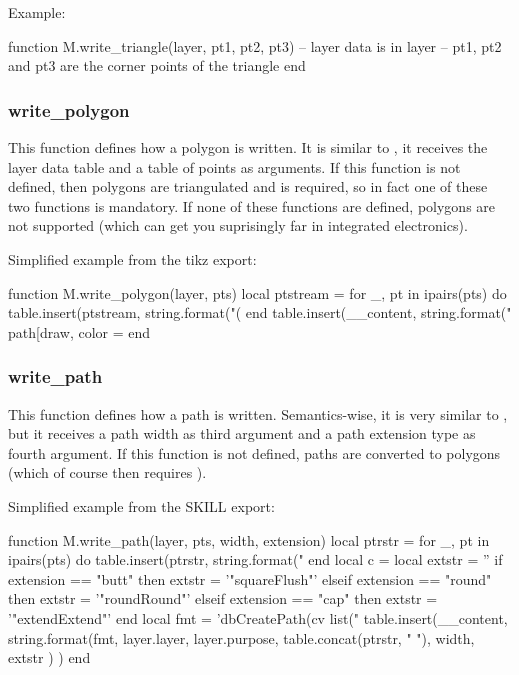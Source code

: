 Example:
\begin{lualisting}
    function M.write_triangle(layer, pt1, pt2, pt3)
        -- layer data is in layer
        -- pt1, pt2 and pt3 are the corner points of the triangle
    end
\end{lualisting}

\subsubsection{write\_polygon}
This function defines how a polygon is written.
It is similar to , it receives the layer data table and a table of points as arguments.
If this function is not defined, then polygons are triangulated and  is required, so in fact one of these two functions is mandatory.
If none of these functions are defined, polygons are not supported (which can get you suprisingly far in integrated electronics).

Simplified example from the tikz export:
\begin{lualisting}
    function M.write_polygon(layer, pts)
        local ptstream = {}
        for _, pt in ipairs(pts) do
            table.insert(ptstream, string.format("(%
        end
        table.insert(__content, string.format("\\path[draw, color = %
    end
\end{lualisting}
%
\subsubsection{write\_path}
This function defines how a path is written.
Semantics-wise, it is very similar to , but it receives a path width as third argument and a path extension type as fourth argument.
If this function is not defined, paths are converted to polygons (which of course then requires ).

Simplified example from the SKILL export:
\begin{lualisting}
    function M.write_path(layer, pts, width, extension)
        local ptrstr = {}
        for _, pt in ipairs(pts) do
            table.insert(ptrstr, string.format("%
        end
        local c = {}
        local extstr = ''
        if extension == "butt" then
            extstr = '"squareFlush"'
        elseif extension == "round" then
            extstr = '"roundRound"'
        elseif extension == "cap" then
            extstr = '"extendExtend"'
        end
        local fmt = 'dbCreatePath(cv list("%
        table.insert(__content, string.format(fmt,
                layer.layer, layer.purpose,
                table.concat(ptrstr, " "),
                width, extstr
            )
        )
    end
\end{lualisting}

